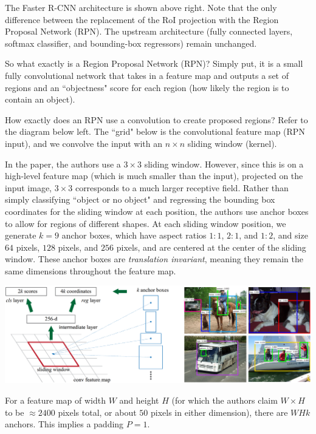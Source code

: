 \documentclass{article}
\begin{document}
The Faster R-CNN architecture is shown above right. Note that the only difference between the replacement of the RoI projection with the Region Proposal Network (RPN). The upstream architecture (fully connected layers, softmax classifier, and bounding-box regressors) remain unchanged.

So what exactly is a Region Proposal Network (RPN)? Simply put, it is a small fully convolutional network that takes in a feature map and outputs a set of regions and an ``objectness" score for each region (how likely the region is to contain an object).

How exactly does an RPN use a convolution to create proposed regions? Refer to the diagram below left. The ``grid" below is the convolutional feature map (RPN input), and we convolve the input with an $n\times n$ sliding window (kernel).

In the paper, the authors use a $3\times3$ sliding window. However, since this is on a high-level feature map (which is much smaller than the input), projected on the input image, $3\times3$ corresponds to a much larger receptive field. Rather than simply classifying ``object or no object" and regressing the bounding box coordinates for the sliding window at each position, the authors use anchor boxes to allow for regions of different shapes. At each sliding window position, we generate $k=9$ anchor boxes, which have aspect ratios $1:1$, $2:1$, and $1:2$, and size $64$ pixels, $128$ pixels, and $256$ pixels, and are centered at the center of the sliding window. These anchor boxes are \textit{translation invariant}, meaning they remain the same dimensions throughout the feature map.

\begin{center}
\includegraphics[scale=0.32]{anchorboxes.PNG}
\end{center}

For a feature map of width $W$ and height $H$ (for which the authors claim $W\times H$ to be $\approx 2400$ pixels total, or about $50$ pixels in either dimension), there are $WHk$ anchors. This implies a padding $P=1$.
\end{document}
